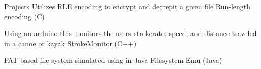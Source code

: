 \begin{cvsection}{Projects}
	\cventry
	{Utilizes RLE encoding to encrypt and decrepit a given file}
	{Run-length encoding (C)}{}{}{}

	\cventry
	{Using an arduino this monitors the users strokerate, speed, and distance traveled in a canoe or kayak}
	{StrokeMonitor (C++)}{}{}{}

	\cventry
	{FAT based file system simulated using in Java}
	{Filesystem-Emu (Java)}{}{}{}
	
\end{cvsection}
